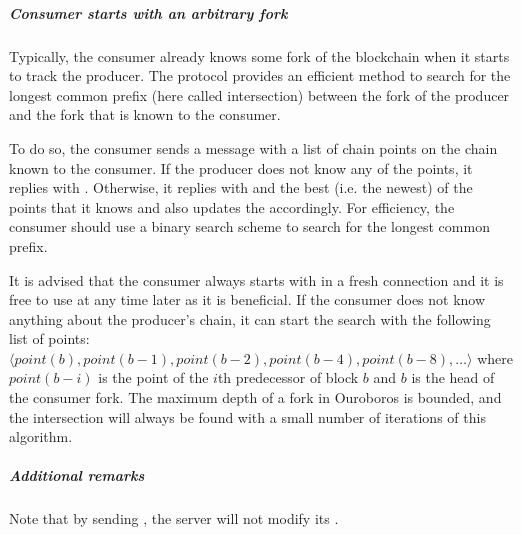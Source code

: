 \subparagraph{Consumer starts with an arbitrary fork}
Typically, the consumer already knows some fork of the blockchain when it
starts to track the producer.
The protocol provides an efficient method to search for the longest common prefix (here called intersection)
between the fork of the producer and the fork that is known to the consumer.

To do so, the consumer sends a \MsgFindIntersect{} message with a list of chain
points on the chain known to the consumer.
If the producer does not know any of the points, it replies with \MsgIntersectNotFound.
Otherwise, it replies with \MsgIntersectFound{} and the best (i.e. the newest) of the points that it knows
and also updates the \readpointer{} accordingly.
For efficiency, the consumer should use a binary search scheme to search for the longest common
prefix.

It is advised that the consumer always starts with \MsgFindIntersect{} in a fresh connection
and it is free to use \MsgFindIntersect{} at any time later as it is beneficial.
If the consumer does not know anything about the producer's chain,
it can start the search with the following list of points:
$\langle point(b), point(b-1), point(b-2), point(b-4), point (b-8),\ldots \rangle$
where $point(b-i)$ is the point of the $i$th predecessor of block $b$ and
$b$ is the head of the consumer fork.
The maximum depth of a fork in Ouroboros is bounded, and the intersection will always be found with a small number of
iterations of this algorithm.

\subparagraph{Additional remarks}
Note that by sending \MsgFindIntersect{}, the server will not modify its
\readpointer{}.

